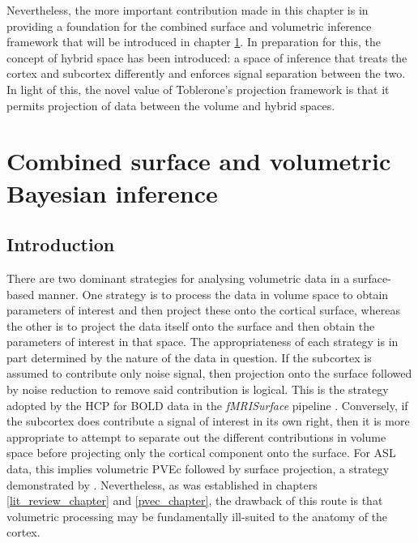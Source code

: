 \documentclass[12pt]{report}
\begin{document}
Nevertheless, the more important contribution made in this chapter is in providing a foundation for the combined surface and volumetric inference framework that will be introduced in chapter \ref{svb_chapter}. In preparation for this, the concept of hybrid space has been introduced: a space of inference that treats the cortex and subcortex differently and enforces signal separation between the two. In light of this, the novel value of Toblerone's projection framework is that it permits projection of data between the volume and hybrid spaces. 




 \newpage 
 \newpage %


\chapter{Combined surface and volumetric Bayesian inference}
\label{svb_chapter}

\section{Introduction}

There are two dominant strategies for analysing volumetric data in a surface-based manner. One strategy is to process the data in volume space to obtain parameters of interest and then project these onto the cortical surface, whereas the other is to project the data itself onto the surface and then obtain the parameters of interest in that space. The appropriateness of each strategy is in part determined by the nature of the data in question. If the subcortex is assumed to contribute only noise signal, then projection onto the surface followed by noise reduction to remove said contribution is logical. This is the strategy adopted by the HCP for BOLD data in the \textit{fMRISurface} pipeline \cite{Glasser2013}. Conversely, if the subcortex does contribute a signal of interest in its own right, then it is more appropriate to attempt to separate out the different contributions in volume space before projecting only the cortical component onto the surface. For ASL data, this implies volumetric PVEc followed by surface projection, a strategy demonstrated by \cite{Verclytte2015}. Nevertheless, as was established in chapters \ref{lit_review_chapter} and \ref{pvec_chapter}, the drawback of this route is that volumetric processing may be fundamentally ill-suited to the anatomy of the cortex. 
\end{document}
